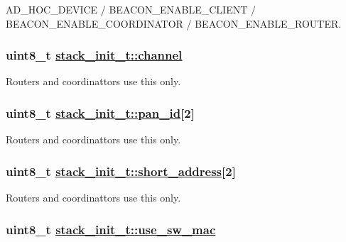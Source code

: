 AD\_\-HOC\_\-DEVICE / BEACON\_\-ENABLE\_\-CLIENT / BEACON\_\-ENABLE\_\-COORDINATOR / BEACON\_\-ENABLE\_\-ROUTER. \hypertarget{structstack__init__t_8c9d5d500e1c3cabe2d2b5950d09c39d}{
\subsubsection[channel]{\setlength{\rightskip}{0pt plus 5cm}uint8\_\-t \hyperlink{structstack__init__t_8c9d5d500e1c3cabe2d2b5950d09c39d}{stack\_\-init\_\-t::channel}}}
\label{structstack__init__t_8c9d5d500e1c3cabe2d2b5950d09c39d}


Routers and coordinattors use this only. \hypertarget{structstack__init__t_0b3e8601ce7872c7f84e6cca0578df99}{
\subsubsection[pan\_\-id]{\setlength{\rightskip}{0pt plus 5cm}uint8\_\-t \hyperlink{structstack__init__t_0b3e8601ce7872c7f84e6cca0578df99}{stack\_\-init\_\-t::pan\_\-id}\mbox{[}2\mbox{]}}}
\label{structstack__init__t_0b3e8601ce7872c7f84e6cca0578df99}


Routers and coordinattors use this only. \hypertarget{structstack__init__t_05a9f2e4bedbe10b126a776c42e00194}{
\subsubsection[short\_\-address]{\setlength{\rightskip}{0pt plus 5cm}uint8\_\-t \hyperlink{structstack__init__t_05a9f2e4bedbe10b126a776c42e00194}{stack\_\-init\_\-t::short\_\-address}\mbox{[}2\mbox{]}}}
\label{structstack__init__t_05a9f2e4bedbe10b126a776c42e00194}


Routers and coordinattors use this only. \hypertarget{structstack__init__t_f2ce0b6ca35ce13964f9bfe6b728f68a}{
\subsubsection[use\_\-sw\_\-mac]{\setlength{\rightskip}{0pt plus 5cm}uint8\_\-t \hyperlink{structstack__init__t_f2ce0b6ca35ce13964f9bfe6b728f68a}{stack\_\-init\_\-t::use\_\-sw\_\-mac}}}
\label{structstack__init__t_f2ce0b6ca35ce13964f9bfe6b728f68a}



